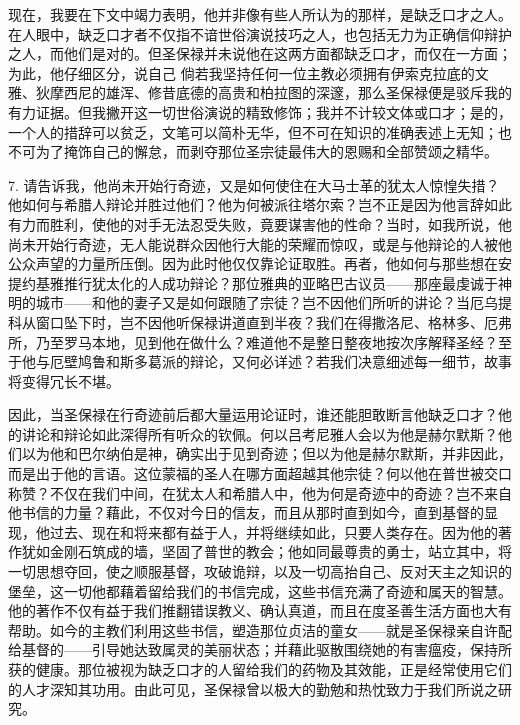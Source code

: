 现在，我要在下文中竭力表明，他并非像有些人所认为的那样，是缺乏口才之人。在人眼中，缺乏口才者不仅指不谙世俗演说技巧之人，也包括无力为正确信仰辩护之人，而他们是对的。但圣保禄并未说他在这两方面都缺乏口才，而仅在一方面；为此，他仔细区分，说自己 倘若我坚持任何一位主教必须拥有伊索克拉底的文雅、狄摩西尼的雄浑、修昔底德的高贵和柏拉图的深邃，那么圣保禄便是驳斥我的有力证据。但我撇开这一切世俗演说的精致修饰；我并不计较文体或口才；是的，一个人的措辞可以贫乏，文笔可以简朴无华，但不可在知识的准确表述上无知；也不可为了掩饰自己的懈怠，而剥夺那位圣宗徒最伟大的恩赐和全部赞颂之精华。\par

7. 请告诉我，他尚未开始行奇迹，又是如何使住在大马士革的犹太人惊惶失措？ 他如何与希腊人辩论并胜过他们？他为何被派往塔尔索？岂不正是因为他言辞如此有力而胜利，使他的对手无法忍受失败，竟要谋害他的性命？当时，如我所说，他尚未开始行奇迹，无人能说群众因他行大能的荣耀而惊叹，或是与他辩论的人被他公众声望的力量所压倒。因为此时他仅仅靠论证取胜。再者，他如何与那些想在安提约基雅推行犹太化的人成功辩论？那位雅典的亚略巴古议员——那座最虔诚于神明的城市——和他的妻子又是如何跟随了宗徒？岂不因他们所听的讲论？当厄乌提科从窗口坠下时，岂不因他听保禄讲道直到半夜？我们在得撒洛尼、格林多、厄弗所，乃至罗马本地，见到他在做什么？难道他不是整日整夜地按次序解释圣经？至于他与厄壁鸠鲁和斯多葛派的辩论，又何必详述？若我们决意细述每一细节，故事将变得冗长不堪。\par

因此，当圣保禄在行奇迹前后都大量运用论证时，谁还能胆敢断言他缺乏口才？他的讲论和辩论如此深得所有听众的钦佩。何以吕考尼雅人会以为他是赫尔默斯？他们以为他和巴尔纳伯是神，确实出于见到奇迹；但以为他是赫尔默斯，并非因此，而是出于他的言语。这位蒙福的圣人在哪方面超越其他宗徒？何以他在普世被交口称赞？不仅在我们中间，在犹太人和希腊人中，他为何是奇迹中的奇迹？岂不来自他书信的力量？藉此，不仅对今日的信友，而且从那时直到如今，直到基督的显现，他过去、现在和将来都有益于人，并将继续如此，只要人类存在。因为他的著作犹如金刚石筑成的墙，坚固了普世的教会；他如同最尊贵的勇士，站立其中，将一切思想夺回，使之顺服基督，攻破诡辩，以及一切高抬自己、反对天主之知识的堡垒，这一切他都藉着留给我们的书信完成，这些书信充满了奇迹和属天的智慧。他的著作不仅有益于我们推翻错误教义、确认真道，而且在度圣善生活方面也大有帮助。如今的主教们利用这些书信，塑造那位贞洁的童女——就是圣保禄亲自许配给基督的——引导她达致属灵的美丽状态；并藉此驱散围绕她的有害瘟疫，保持所获的健康。那位被视为缺乏口才的人留给我们的药物及其效能，正是经常使用它们的人才深知其功用。由此可见，圣保禄曾以极大的勤勉和热忱致力于我们所说之研究。\par

